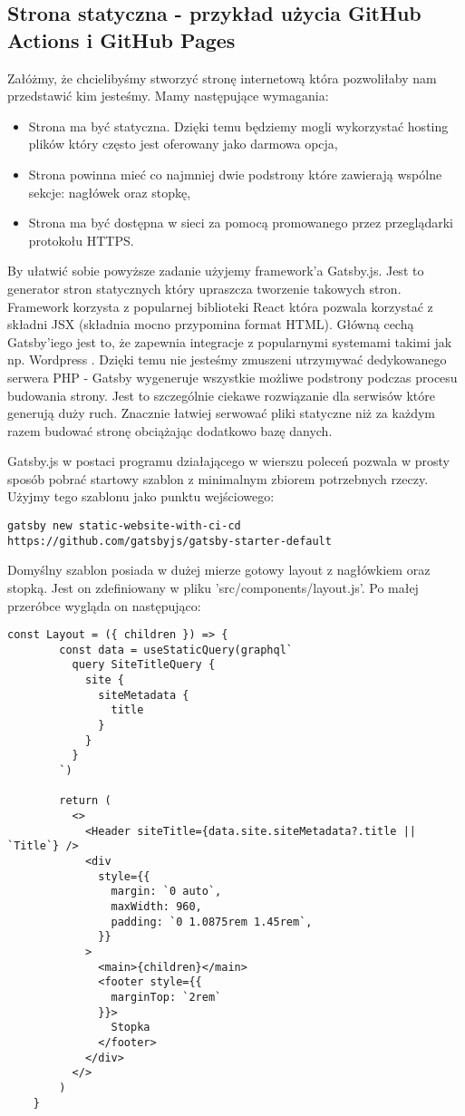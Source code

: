 \subsection{Strona statyczna - przykład użycia GitHub Actions i GitHub Pages}
Załóżmy, że chcielibyśmy stworzyć stronę internetową która pozwoliłaby nam przedstawić kim jesteśmy. Mamy następujące wymagania:
\begin{itemize}
    \item Strona ma być statyczna. Dzięki temu będziemy mogli wykorzystać hosting plików który często jest oferowany jako darmowa opcja,
    \item Strona powinna mieć co najmniej dwie podstrony które zawierają wspólne sekcje: nagłówek oraz stopkę,
    \item Strona ma być dostępna w sieci za pomocą  promowanego przez przeglądarki protokołu HTTPS.
\end{itemize}
By ułatwić sobie powyższe zadanie użyjemy framework'a Gatsby.js. Jest to generator stron statycznych który upraszcza tworzenie takowych stron. Framework korzysta z popularnej biblioteki React która pozwala korzystać z składni JSX (składnia mocno przypomina format HTML). Główną cechą Gatsby'iego jest to, że zapewnia integracje z popularnymi systemami takimi jak np. Wordpress \cite{GatsbyJSWordpress}. Dzięki temu nie jesteśmy zmuszeni utrzymywać dedykowanego serwera PHP - Gatsby wygeneruje wszystkie możliwe podstrony podczas procesu budowania strony. Jest to szczególnie ciekawe rozwiązanie dla serwisów które generują duży ruch. Znacznie łatwiej serwować pliki statyczne niż za każdym razem budować stronę obciążając dodatkowo bazę danych.
\par
Gatsby.js w postaci programu działającego w wierszu poleceń pozwala w prosty sposób pobrać startowy szablon z minimalnym zbiorem potrzebnych rzeczy. Użyjmy tego szablonu jako punktu wejściowego:
\begin{lstlisting}[caption={Pobierania szablonu startowego}]
    gatsby new static-website-with-ci-cd https://github.com/gatsbyjs/gatsby-starter-default
\end{lstlisting}
Domyślny szablon posiada w dużej mierze gotowy layout z nagłówkiem oraz stopką. Jest on zdefiniowany w pliku 'src/components/layout.js'. Po małej przeróbce wygląda on następująco:
\begin{lstlisting}[caption={Layout - komponent zawierający logikę związaną z layoutem strony}]
    const Layout = ({ children }) => {
        const data = useStaticQuery(graphql`
          query SiteTitleQuery {
            site {
              siteMetadata {
                title
              }
            }
          }
        `)
      
        return (
          <>
            <Header siteTitle={data.site.siteMetadata?.title || `Title`} />
            <div
              style={{
                margin: `0 auto`,
                maxWidth: 960,
                padding: `0 1.0875rem 1.45rem`,
              }}
            >
              <main>{children}</main>
              <footer style={{
                marginTop: `2rem`
              }}>
                Stopka
              </footer>
            </div>
          </>
        )
    }
\end{lstlisting}

